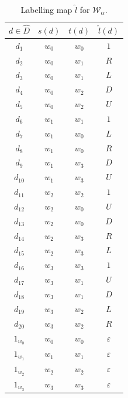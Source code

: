 \begin{table}[H]
	\centering
	\begin{tabular}{|c|cc||c|}
		\hline
		$d \in \hat{D}$ & $s(d)$  & $t(d)$  & $\hat{l}(d)$ \\
		\hline
		$d_{1}$         & $w_{0}$ & $w_{0}$ & $1$          \\
		$d_{2}$         & $w_{0}$ & $w_{1}$ & $R$          \\
		$d_{3}$         & $w_{0}$ & $w_{1}$ & $L$          \\
		$d_{4}$         & $w_{0}$ & $w_{2}$ & $D$          \\
		$d_{5}$         & $w_{0}$ & $w_{2}$ & $U$          \\
		$d_{6}$         & $w_{1}$ & $w_{1}$ & $1$          \\
		$d_{7}$         & $w_{1}$ & $w_{0}$ & $L$          \\
		$d_{8}$         & $w_{1}$ & $w_{0}$ & $R$          \\
		$d_{9}$         & $w_{1}$ & $w_{3}$ & $D$          \\
		$d_{10}$        & $w_{1}$ & $w_{3}$ & $U$          \\
		$d_{11}$        & $w_{2}$ & $w_{2}$ & $1$          \\
		$d_{12}$        & $w_{2}$ & $w_{0}$ & $U$          \\
		$d_{13}$        & $w_{2}$ & $w_{0}$ & $D$          \\
		$d_{14}$        & $w_{2}$ & $w_{3}$ & $R$          \\
		$d_{15}$        & $w_{2}$ & $w_{3}$ & $L$          \\
		$d_{16}$        & $w_{3}$ & $w_{3}$ & $1$          \\
		$d_{17}$        & $w_{3}$ & $w_{1}$ & $U$          \\
		$d_{18}$        & $w_{3}$ & $w_{1}$ & $D$          \\
		$d_{19}$        & $w_{3}$ & $w_{2}$ & $L$          \\
		$d_{20}$        & $w_{3}$ & $w_{2}$ & $R$          \\
		$1_{w_{0}}$     & $w_{0}$ & $w_{0}$ & $\varepsilon$   \\
		$1_{w_{1}}$     & $w_{1}$ & $w_{1}$ & $\varepsilon$   \\
		$1_{w_{2}}$     & $w_{2}$ & $w_{2}$ & $\varepsilon$   \\
		$1_{w_{3}}$     & $w_{3}$ & $w_{3}$ & $\varepsilon$   \\
		\hline
	\end{tabular}
	\caption{
		Labelling map $\hat{l}$ for $\mathscr{W}_{\alpha}$.
	}
	\label{tab:2x2_cyclical_labelling_with_min_actions}
\end{table}

